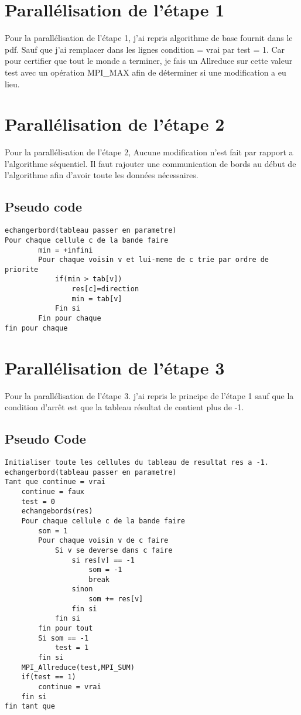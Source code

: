 \documentclass[12pt,a4paper,utf8x]{report}
\begin{document}
\begin{onehalfspace}
	
\section{Parallélisation de l'étape 1}

Pour la parallélisation de l'étape 1, j'ai repris algorithme de base fournit dans le pdf. Sauf que j'ai remplacer dans les lignes condition = vrai par test = 1.
Car pour certifier que tout le monde a terminer, je fais un Allreduce sur cette valeur test avec un opération MPI\_MAX afin de déterminer si une modification a eu lieu.

\section{Parallélisation de l'étape 2}

Pour la parallélisation de l'étape 2, Aucune modification n'est fait par rapport a l'algorithme séquentiel. Il faut rajouter une communication de bords au début de l'algorithme afin d'avoir toute les données nécessaires.

\subsection{Pseudo code}

\begin{lstlisting}
echangerbord(tableau passer en parametre)
Pour chaque cellule c de la bande faire
		min = +infini
		Pour chaque voisin v et lui-meme de c trie par ordre de priorite
			if(min > tab[v])
				res[c]=direction
				min = tab[v]
			Fin si
		Fin pour chaque
fin pour chaque		
\end{lstlisting}
\newpage

\section{Parallélisation de l'étape 3}

Pour la parallélisation de l'étape 3. j'ai repris le principe de l'étape 1 sauf que la condition d'arrêt est que la tableau résultat de contient plus de -1. 

\subsection{Pseudo Code}
\begin{lstlisting}
Initialiser toute les cellules du tableau de resultat res a -1.
echangerbord(tableau passer en parametre)
Tant que continue = vrai
	continue = faux
	test = 0
	echangebords(res)
	Pour chaque cellule c de la bande faire
		som = 1
		Pour chaque voisin v de c faire
			Si v se deverse dans c faire
				si res[v] == -1
					som = -1
					break
				sinon
					som += res[v]
				fin si
			fin si
		fin pour tout
		Si som == -1
			test = 1
		fin si
	MPI_Allreduce(test,MPI_SUM)
	if(test == 1)
		continue = vrai
	fin si
fin tant que
	

\end{lstlisting}
\end{onehalfspace}
\end{document}
